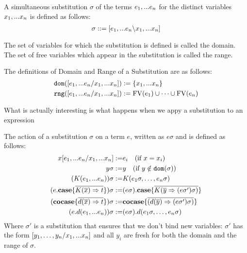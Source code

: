 \documentclass[twoside,12pt,a4paper]{article}
\begin{document}
\begin{definition}[Substitution]
    A simultaneous substitution $\sigma$ of the terms $e_1,...e_n$ for the distinct variables $x_1,...x_n$ is defined as follows:
    \begin{align*} %
        \sigma ::= [\listofexpr \backslash\listofvar]
    \end{align*}
\end{definition}

The set of variables for which the substitution is defined is called the domain.
The set of free variables which appear in the substitution is called the range. %

\begin{definition}
    The definitions of Domain and Range of a Substitution are as follows:
    \begin{align*}
        \texttt{dom}([e_1,...e_n/x_1,...x_n]) &:= \{x_1,...x_n\}\\
        \texttt{rng}([e_1,...e_n/x_1,...x_n]) &:= \text{FV}(e_1)\cup \dots\cup\text{FV}(e_n)
    \end{align*}
\end{definition}

What is actually interesting is what happens when we appy a substitution to an expression

\begin{definition}
    The action of a substitution $\sigma$ on a term $e$, written as $e \sigma$ and is defined as follows:
    \begin{align*}
        x[e_1,...e_n / x_1,...x_n] :=& e_i \quad(\text{if } x=x_i) \\
        y\sigma :=& y\quad (\text{if }y\notin \texttt{dom}(\sigma))\\
        (K(e_1,...e_n))\sigma :=& K(e_1 \sigma,\dots , e_n \sigma)\\
        (e.\textbf{case}\{\overline{K(\overline{x})\Rightarrow t}\})\sigma:=& (e\sigma).\textbf{case}\{\overline{K(\overline{y}\Rightarrow (e\sigma')\sigma)}\}\\
        (\textbf{cocase}\{\overline{d(\overline{x})\Rightarrow t}\})\sigma:=& \textbf{cocase}\{\overline{(d(\overline{y})\Rightarrow(e\sigma')\sigma)}\}\\
        (e.d(e_1,...e_n)) \sigma:=& (e \sigma).d(e_1 \sigma,\dots , e_n \sigma)
    \end{align*} 
    Where $\sigma'$ is a substitution that ensures that we don't bind new variables: 
    $\sigma'$ has the form $[y_1,\dots, y_n/x_1,...x_n]$ and all $y_i$ are fresh for both the domain and the range of $\sigma$.
\end{definition}
\end{document}
